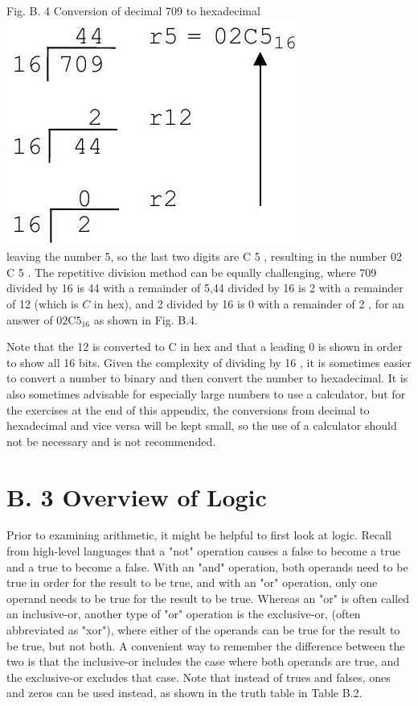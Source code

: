 \documentclass[10pt]{article}
\begin{document}
Fig. B. 4 Conversion of decimal 709 to hexadecimal\\
\includegraphics[max width=\textwidth, center]{2025_03_24_ebe50cc223a6fbc49eecg-308}\\
leaving the number 5, so the last two digits are C 5 , resulting in the number 02 C 5 . The repetitive division method can be equally challenging, where 709 divided by 16 is 44 with a remainder of 5,44 divided by 16 is 2 with a remainder of 12 (which is $C$ in hex), and 2 divided by 16 is 0 with a remainder of 2 , for an answer of $02 \mathrm{C} 5{ }_{16}$ as shown in Fig. B.4.

Note that the 12 is converted to C in hex and that a leading 0 is shown in order to show all 16 bits. Given the complexity of dividing by 16 , it is sometimes easier to convert a number to binary and then convert the number to hexadecimal. It is also sometimes advisable for especially large numbers to use a calculator, but for the exercises at the end of this appendix, the conversions from decimal to hexadecimal and vice versa will be kept small, so the use of a calculator should not be necessary and is not recommended.

\section*{B. 3 Overview of Logic}
Prior to examining arithmetic, it might be helpful to first look at logic. Recall from high-level languages that a "not" operation causes a false to become a true and a true to become a false. With an "and" operation, both operands need to be true in order for the result to be true, and with an "or" operation, only one operand needs to be true for the result to be true. Whereas an "or" is often called an inclusive-or, another type of "or" operation is the exclusive-or, (often abbreviated as "xor"), where either of the operands can be true for the result to be true, but not both. A convenient way to remember the difference between the two is that the inclusive-or includes the case where both operands are true, and the exclusive-or excludes that case. Note that instead of trues and falses, ones and zeros can be used instead, as shown in the truth table in Table B.2.
\end{document}
